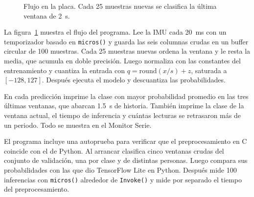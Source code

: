 \documentclass[11pt,a4paper]{article}
\begin{document}
\begin{figure}[htbp]
\centering
{}
\caption{Flujo en la placa. Cada 25 muestras nuevas se clasifica la última ventana de 2~s.}
\label{fig:flujo}
\end{figure}

La figura~\ref{fig:flujo} muestra el flujo del programa. Lee la IMU cada 20~ms con un temporizador basado en \texttt{micros()} y guarda las seis columnas crudas en un buffer circular de 100 muestras. Cada 25 muestras nuevas ordena la ventana y le resta la media, que acumula en doble precisión. Luego normaliza con las constantes del entrenamiento y cuantiza la entrada con $q = \mathrm{round}(x/s) + z$, saturada a $[-128, 127]$. Después ejecuta el modelo y descuantiza las probabilidades.

En cada predicción imprime la clase con mayor probabilidad promedio en las tres últimas ventanas, que abarcan 1.5~s de historia. También imprime la clase de la ventana actual, el tiempo de inferencia y cuántas lecturas se retrasaron más de un periodo. Todo se muestra en el Monitor Serie.

El programa incluye una autoprueba para verificar que el preprocesamiento en C coincide con el de Python. Al arrancar clasifica cinco ventanas crudas del conjunto de validación, una por clase y de distintas personas. Luego compara sus probabilidades con las que dio TensorFlow Lite en Python. Después mide 100 inferencias con \texttt{micros()} alrededor de \texttt{Invoke()} y mide por separado el tiempo del preprocesamiento.
\end{document}
